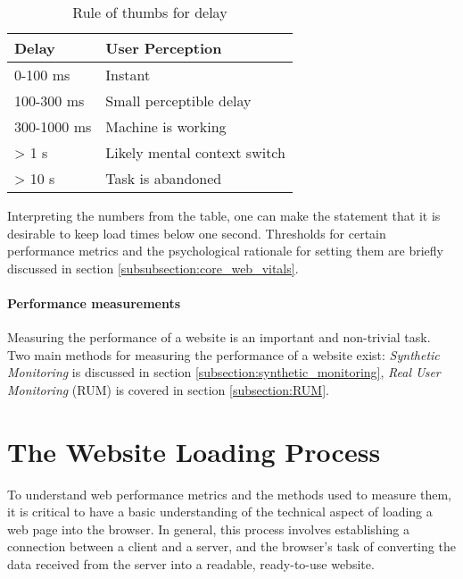 \begin{table}[h]
	\small
	\centering
	\begin{tabular}{| l | l | }
	\hline
	Delay \cellcolor{lightgrey} & User Perception \cellcolor{lightgrey} \\
	\hline
	0-100 ms & Instant \\
	100-300 ms & Small perceptible delay \\
	300-1000 ms & Machine is working \\
	> 1 s & Likely mental context switch \\
	> 10 s & Task is abandoned \\
	\hline
	\end{tabular}
	\medskip
	\caption{Rule of thumbs for delay}
	\label{table:perception}
\end{table}

Interpreting the numbers from the table, one can make the statement that it is desirable to keep load times below one second.
Thresholds for certain performance metrics and the psychological rationale for setting them are briefly discussed in section \ref{subsubsection:core_web_vitals}.




\paragraph{Performance measurements} %

Measuring the performance of a website is an important and non-trivial task.
Two main methods for measuring the performance of a website exist:
\textit{Synthetic Monitoring} is discussed in section \ref{subsection:synthetic_monitoring},
\textit{Real User Monitoring} (RUM) is covered in section \ref{subsection:RUM}.


\section{The Website Loading Process} %
\label{section:website_loading_process}


To understand web performance metrics and the methods used to measure them, it is critical to have a basic understanding of the technical aspect of loading a web page into the browser. 
In general, this process involves establishing a connection between a client and a server, and the browser's task of converting the data received from the server into a readable, ready-to-use website.

